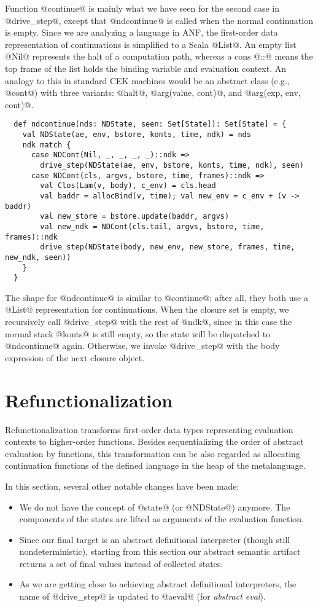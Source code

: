 \documentclass[acmsmall, review]{acmart}\settopmatter{}
\begin{document}
Function @continue@ is mainly what we have seen for the second case in
@drive_step@, except that @ndcontinue@ is called when
the normal continuation is empty.
Since we are analyzing a language in ANF, the first-order data representation of
continuations is simplified to a Scala @List@.
An empty list @Nil@ represents the halt of a computation path, whereas
a cons @::@ means the top frame of the list holds the binding variable and
evaluation context.
An analogy to this in standard CEK machines would be an abstract class (e.g., @cont@) with
three variants: @halt@, @arg(value, cont)@, and @arg(exp, env, cont)@.

\begin{lstlisting}
  def ndcontinue(nds: NDState, seen: Set[State]): Set[State] = {
    val NDState(ae, env, bstore, konts, time, ndk) = nds
    ndk match {
      case NDCont(Nil, _, _, _, _)::ndk =>
        drive_step(NDState(ae, env, bstore, konts, time, ndk), seen)
      case NDCont(cls, argvs, bstore, time, frames)::ndk =>
        val Clos(Lam(v, body), c_env) = cls.head
        val baddr = allocBind(v, time); val new_env = c_env + (v -> baddr)
        val new_store = bstore.update(baddr, argvs)
        val new_ndk = NDCont(cls.tail, argvs, bstore, time, frames)::ndk
        drive_step(NDState(body, new_env, new_store, frames, time, new_ndk, seen))
    }
  }
\end{lstlisting}

The shape for @ndcontinue@ is similar to @continue@; after
all, they both use a @List@ representation for continuations.
When the closure set is empty, we recursively call @drive_step@ with the rest
of @ndk@, since in this case the normal stack @konts@ is still empty, so
the state will be dispatched to @ndcontinue@ again.
Otherwise, we invoke @drive_step@ with the body expression of the next closure object.

\section{Refunctionalization} \label{sec:refunc}

Refunctionalization transforms first-order data types representing
evaluation contexts to higher-order functions.
Besides sequentializing the order of abstract evaluation by functions,
this transformation can be also regarded as allocating continuation functions of
the defined language in the heap of the metalanguage.

In this section, several other notable changes have been made:
\begin{itemize}
\item We do not have the concept of @state@ (or @NDState@) anymore.
The components of the states are lifted as arguments of the evaluation
function.
\item Since our final target is an abstract definitional interpreter (though still
nondeterministic), starting from this section our abstract semantic artifact
returns a set of final values instead of collected states.
\item As we are getting close to achieving
abstract definitional interpreters, the name of @drive_step@ is updated to
@aeval@ (for \emph{abstract eval}).
\end{itemize}
\end{document}
